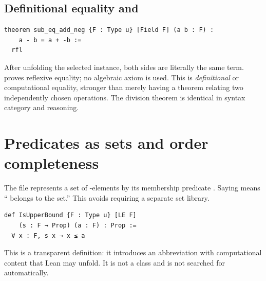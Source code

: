 \documentclass[11pt]{article}
\newcommand{\code}[1]{\texttt{\detokenize{#1}}}
\begin{document}
\begin{center}
\end{center}

\subsection{Definitional equality and \code{rfl}}

\begin{lstlisting}
theorem sub_eq_add_neg {F : Type u} [Field F] (a b : F) :
    a - b = a + -b :=
  rfl
\end{lstlisting}

After unfolding the selected \code{Sub F} instance, both sides are literally the same
term. \code{rfl} proves reflexive equality; no algebraic axiom is used. This is
\emph{definitional} or computational equality, stronger than merely having a theorem
relating two independently chosen operations. The division theorem is identical in
syntax category and reasoning.

\section{Predicates as sets and order completeness}

The file represents a set of \code{F}-elements by its membership predicate
\code{s : F → Prop}. Saying \code{s x} means ``\code{x} belongs to the set.'' This avoids
requiring a separate set library.

\begin{lstlisting}
def IsUpperBound {F : Type u} [LE F]
    (s : F → Prop) (a : F) : Prop :=
  ∀ x : F, s x → x ≤ a
\end{lstlisting}

This is a transparent definition: it introduces an abbreviation with computational
content that Lean may unfold. It is not a class and is not searched for automatically.
\end{document}
